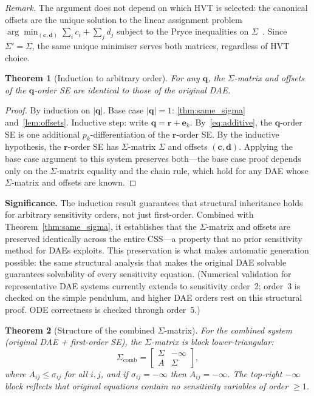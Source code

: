 \documentclass[12pt,a4paper]{article}
\theoremstyle{definition}
\theoremstyle{plain}
\newtheorem{theorem}{Theorem}[section]
\theoremstyle{remark}
\newcommand{\vq}{\mathbf{q}}
\newcommand{\vr}{\mathbf{r}}
\newcommand{\vc}{\mathbf{c}}
\newcommand{\vd}{\mathbf{d}}
\begin{document}
\smallskip\noindent
\textit{Remark.} The argument does not depend on which HVT is selected: the canonical offsets are the unique solution to the linear assignment problem $\arg\min_{(\vc,\vd)} \sum_i c_i + \sum_j d_j$ subject to the Pryce inequalities on $\Sigma$~\cite{pryce2001simple}. Since $\Sigma' = \Sigma$, the same unique minimiser serves both matrices, regardless of HVT choice.

\begin{theorem}[Induction to arbitrary order]
\label{thm:induction}
For any $\vq$, the $\Sigma$-matrix and offsets of the $\vq$-order SE are identical to those of the original DAE.
\end{theorem}

\begin{proof}
By induction on $|\vq|$. Base case $|\vq|=1$: \cref{thm:same_sigma} and~\cref{lem:offsets}. Inductive step: write $\vq = \vr + \mathbf{e}_k$. By~\eqref{eq:additive}, the $\vq$-order SE is one additional $p_k$-differentiation of the $\vr$-order SE. By the inductive hypothesis, the $\vr$-order SE has $\Sigma$-matrix $\Sigma$ and offsets $(\vc,\vd)$. Applying the base case argument to this system preserves both---the base case proof depends only on the $\Sigma$-matrix equality and the chain rule, which hold for any DAE whose $\Sigma$-matrix and offsets are known.
\end{proof}

\smallskip\noindent
\textbf{Significance.} The induction result guarantees that structural inheritance holds for arbitrary sensitivity orders, not just first-order. Combined with Theorem~\ref{thm:same_sigma}, it establishes that the $\Sigma$-matrix and offsets are preserved identically across the entire CSS---a property that no prior sensitivity method for DAEs exploits. This preservation is what makes automatic generation possible: the same structural analysis that makes the original DAE solvable guarantees solvability of every sensitivity equation. (Numerical validation for representative DAE systems currently extends to sensitivity order~2; order~3 is checked on the simple pendulum, and higher DAE orders rest on this structural proof. ODE correctness is checked through order~5.)

\begin{theorem}[Structure of the combined $\Sigma$-matrix]
\label{thm:combined_sigma}
For the combined system (original DAE + first-order SE), the $\Sigma$-matrix is block lower-triangular:
\[
  \Sigma_{\text{comb}} =
  \begin{bmatrix}
    \Sigma & -\infty \\
    A      & \Sigma
  \end{bmatrix},
\]
where $A_{ij}\le\sigma_{ij}$ for all $i,j$, and if $\sigma_{ij} = -\infty$ then $A_{ij} = -\infty$. The top-right $-\infty$ block reflects that original equations contain no sensitivity variables of order $\ge 1$.
\end{theorem}
\end{document}
